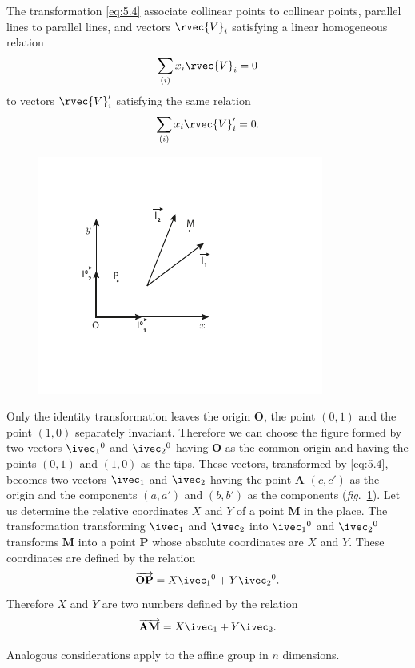 The transformation \eqref{eq:5.4} associate collinear points to collinear points, parallel lines to parallel lines, and vectors $\rvec{V}_{i}$ satisfying a linear homogeneous relation
\[
\sum_{(i)}x_{i}\rvec{V}_{i}=0
\]
to vectors $\rvec{V}'_{i}$ satisfying the same relation
\[
\sum_{(i)}x_{i}\rvec{V}'_{i}=0.
\]
\begin{figure}[h]
  \centering
\includegraphics[scale=2]{cartangrp-f4}  
  \caption{}
  \label{fig:4}
\end{figure}
Only the identity transformation leaves the origin $\mathbf{O}$, the point $(0,1)$ and the point $(1,0)$ separately invariant. Therefore we can choose the figure formed by two vectors $\ivec_{1}{}^{0}$ and $\ivec_{2}{}^{0}$ having $\mathbf{O}$ as the common origin and having the points $(0,1)$ and $(1,0)$ as the tips. These vectors, transformed by \eqref{eq:5.4}, becomes two vectors $\ivec_{1}$ and $\ivec_{2}$ having the point $\mathbf{A}$ $(c,c')$ as the origin and the components $(a,a')$ and $(b,b')$ as the components (\emph{fig}.~\ref{fig:4}). Let us determine the relative coordinates ${X}$ and ${Y}$ of a point $\mathbf{M}$ in the place. The transformation transforming $\ivec_{1}$ and $\ivec_{2}$ into $\ivec_{1}{}^{0}$ and $\ivec_{2}{}^{0}$ transforms $\mathbf{M}$ into a point $\mathbf{P}$ whose absolute coordinates are $X$ and $Y$. These coordinates are defined by the relation
\[
\overrightarrow{\mathbf{OP}}=X\ivec_{1}{}^{0}+Y\ivec_{2}{}^{0}.
\]
Therefore $X$ and $Y$ are two numbers defined by the relation
\[
\overrightarrow{\mathbf{AM}}=X\ivec_{1}+Y\ivec_{2}.
\]

Analogous considerations apply to the affine group in $n$ dimensions.



